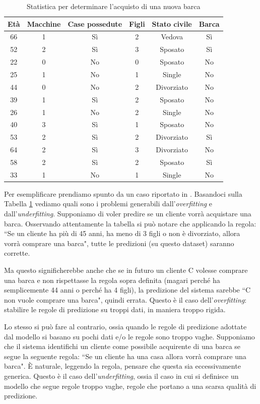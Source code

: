 \documentclass[12pt,italian]{report}
\begin{document}
\begin{table}[h!]
	\center
	\caption{Statistica per determinare l'acquisto di una nuova barca}
	\label{table_customers}
	\vspace{3 mm}
	\begin{tabular}{|c|c|c|c|c|c|}
		\hline
		Età & Macchine &  Case possedute & Figli & Stato civile & Barca    \\
		\hline
		66 & 1 & Sì & 2 & Vedova & Sì \\
		52 & 2 & Sì & 3 & Sposato & Sì \\
		22 & 0 & No & 0 & Sposato & No \\
		25 & 1 & No & 1 & Single & No \\
		44 & 0 & No & 2 & Divorziato & No \\
		39 & 1 & Sì & 2 & Sposato & No \\
		26 & 1 & No & 2 & Single & No \\
		40 & 3 & Sì & 1 & Sposato & No \\
		53 & 2 & Sì & 2 & Divorziato & Sì \\
		64 & 2 & Sì & 3 & Divorziato & No \\
		58 & 2 & Sì & 2 & Sposato & Sì \\
		33 & 1 & No & 1 & Single & No \\
		\hline
	\end{tabular}
\end{table}

Per esemplificare prendiamo spunto da un caso riportato in \cite{intro_machine_learning}. Basandoci sulla Tabella \ref{table_customers} vediamo quali sono i problemi generabili dall'\emph{overfitting} e dall'\emph{underfitting}. Supponiamo di voler predire se un cliente vorrà acquistare una barca. Osservando attentamente la tabella si può notare che applicando la regola: ``Se un cliente ha più di 45 anni, ha meno di 3 figli o non è divorziato, allora vorrà comprare una barca", tutte le predizioni (su questo dataset) saranno corrette.

Ma questo significherebbe anche che se in futuro un cliente C volesse comprare una barca e non rispettasse la regola sopra definita (magari perché ha semplicemente 44 anni o perché ha 4 figli), la predizione del sistema sarebbe ``C non vuole comprare una barca", quindi errata. Questo è il caso dell'\emph{overfitting}: stabilire le regole di predizione su troppi dati, in maniera troppo rigida.

Lo stesso si può fare al contrario, ossia quando le regole di predizione adottate dal modello si basano su pochi dati e/o le regole sono troppo vaghe. Supponiamo che il sistema identifichi un cliente come possibile acquirente di una barca se segue la seguente regola: ``Se un cliente ha una casa allora vorrà comprare una barca". È naturale, leggendo la regola, pensare che questa sia eccessivamente generica. Questo è il caso dell'\emph{underfitting}, ossia il caso in cui si definisce un modello che segue regole troppo vaghe, regole che portano a una scarsa qualità di predizione.
\end{document}
